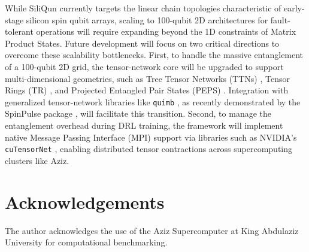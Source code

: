\documentclass[preprint,12pt, a4paper]{elsarticle}
\begin{document}
While SiliQun currently targets the linear chain topologies characteristic of early-stage silicon spin qubit arrays, scaling to 100-qubit 2D architectures for fault-tolerant operations will require expanding beyond the 1D constraints of Matrix Product States. Future development will focus on two critical directions to overcome these scalability bottlenecks. First, to handle the massive entanglement of a 100-qubit 2D grid, the tensor-network core will be upgraded to support multi-dimensional geometries, such as Tree Tensor Networks (TTNs) \cite{shi2006classical}, Tensor Rings (TR) \cite{zhao2016tensor}, and Projected Entangled Pair States (PEPS) \cite{verstraete2004renormalization}. Integration with generalized tensor-network libraries like \texttt{quimb} \cite{gray2018quimb}, as recently demonstrated by the SpinPulse package \cite{vermersch2026spinpulse}, will facilitate this transition. Second, to manage the entanglement overhead during DRL training, the framework will implement native Message Passing Interface (MPI) support via libraries such as NVIDIA's \texttt{cuTensorNet} \cite{cutensornet2024}, enabling distributed tensor contractions across supercomputing clusters like Aziz.

\section*{Acknowledgements}
The author acknowledges the use of the Aziz Supercomputer at King Abdulaziz University for computational benchmarking.
\end{document}
